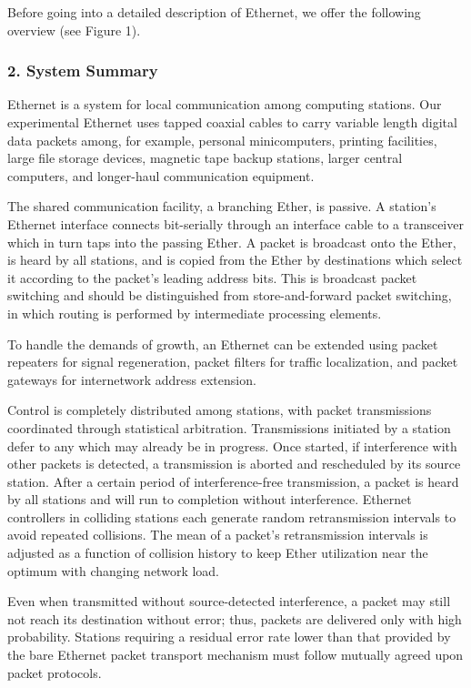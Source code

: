 Before going into a detailed description of Ethernet, we offer the following overview (see Figure 1).

\subsubsection*{2.  System Summary}

Ethernet is a system for local communication among computing stations. Our experimental Ethernet uses tapped coaxial cables to carry variable length digital data packets among, for example, personal minicomputers, printing facilities, large file storage devices, magnetic tape backup stations, larger central computers, and longer-haul communication equipment.

The shared communication facility, a branching Ether, is passive. A station's Ethernet interface connects bit-serially through an interface cable to a transceiver which in turn taps into the passing Ether. A packet is broadcast onto the Ether, is heard by all stations, and is copied from the Ether by destinations which select it according to the packet's leading address bits. This is broadcast packet switching and should be distinguished from store-and-forward packet switching, in which routing is performed by intermediate processing elements.

To handle the demands of growth, an Ethernet can be extended using packet repeaters for signal regeneration, packet filters for traffic localization, and packet gateways for internetwork address extension.



Control is completely distributed among stations, with packet transmissions coordinated through statistical arbitration. Transmissions initiated by a station defer to any which may already be in progress. Once started, if interference with other packets is detected, a transmission is aborted and rescheduled by its source station. After a certain period of interference-free transmission, a packet is heard by all stations and will run to completion without interference. Ethernet controllers in colliding stations each generate random retransmission intervals to avoid repeated collisions. The mean of a packet's retransmission intervals is adjusted as a function of collision history to keep Ether utilization near the optimum with changing network load.

Even when transmitted without source-detected interference, a packet may still not reach its destination without error; thus, packets are delivered only with high probability. Stations requiring a residual error rate lower than that provided by the bare Ethernet packet transport mechanism must follow mutually agreed upon packet protocols.


